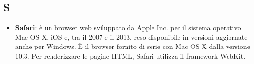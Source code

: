 \subsection{S}
\begin{itemize} 
	\item
	\textbf{Safari}: è un browser web sviluppato da Apple Inc. per il sistema operativo Mac OS X, iOS e, tra il 2007 e il 2013, reso disponibile in versioni aggiornate anche per Windows. È il browser fornito di serie con Mac OS X dalla versione 10.3. Per renderizzare le pagine HTML, Safari utilizza il framework WebKit.
\end{itemize}